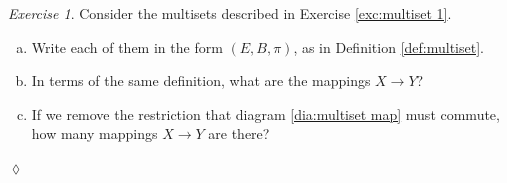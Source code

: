 \documentclass{book}
\def\tn{\textnormal}
\def\NN{{\mathbb N}}
\def\to{\rightarrow}
\def\taking{\colon}
\def\|{{\;|\;}}
\def\m1{{-1}}
\theoremstyle{remark}
\newtheorem{example}[subsubsection]{Example}
\newtheorem{exc}[subsubsection]{Exercise}
\newenvironment{exercise}{\begin{exc}}{\hspace*{\fill}$\lozenge$\end{exc}}
\theoremstyle{definition}
\def\sexc{\begin{enumerate}[a.)]\setlength{\itemsep}{.1cm}\setlength{\parskip}{.1cm}\item}
\def\next{\item}
\def\endsexc{\end{enumerate}}
\begin{document}
\begin{exercise}
Consider the multisets described in Exercise \ref{exc:multiset 1}. 
\sexc Write each of them in the form $(E,B,\pi)$, as in Definition \ref{def:multiset}. 
\next In terms of the same definition, what are the mappings $X\to Y$? 
\next If we remove the restriction that diagram \ref{dia:multiset map} must commute, how many mappings $X\to Y$ are there?
\endsexc
\end{exercise}

%
%
%
%
%
\end{document}
